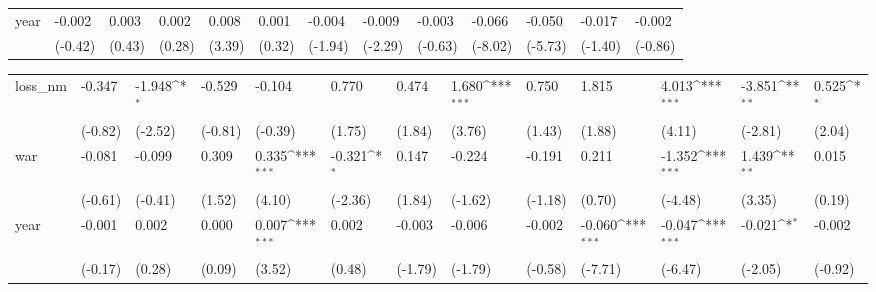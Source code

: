 \begin{tabular}{p{1.5cm} p{1.7cm} p{1.7cm} p{1.7cm} p{1.7cm} p{1.7cm} p{1.7cm} p{1.7cm} p{1.7cm} p{1.7cm} p{1.7cm} p{1.7cm} p{1.7cm}}
year            &   -0.002         &    0.003         &    0.002         &    0.008\sym{**} &    0.001         &   -0.004         &   -0.009\sym{*}  &   -0.003         &   -0.066\sym{***}&   -0.050\sym{***}&   -0.017         &   -0.002         \\
                &  (-0.42)         &   (0.43)         &   (0.28)         &   (3.39)         &   (0.32)         &  (-1.94)         &  (-2.29)         &  (-0.63)         &  (-8.02)         &  (-5.73)         &  (-1.40)         &  (-0.86)         \\
\end{tabular}
\def\sym#1{\ifmmode^{#1}\else\(^{#1}\)\fi}
\begin{tabular}{p{1.5cm} p{1.7cm} p{1.7cm} p{1.7cm} p{1.7cm} p{1.7cm} p{1.7cm} p{1.7cm} p{1.7cm} p{1.7cm} p{1.7cm} p{1.7cm} p{1.7cm}}
\hline
loss\_nm         &   -0.347         &   -1.948\sym{*}  &   -0.529         &   -0.104         &    0.770         &    0.474         &    1.680\sym{***}&    0.750         &    1.815         &    4.013\sym{***}&   -3.851\sym{**} &    0.525\sym{*}  \\
                &  (-0.82)         &  (-2.52)         &  (-0.81)         &  (-0.39)         &   (1.75)         &   (1.84)         &   (3.76)         &   (1.43)         &   (1.88)         &   (4.11)         &  (-2.81)         &   (2.04)         \\
war             &   -0.081         &   -0.099         &    0.309         &    0.335\sym{***}&   -0.321\sym{*}  &    0.147         &   -0.224         &   -0.191         &    0.211         &   -1.352\sym{***}&    1.439\sym{**} &    0.015         \\
                &  (-0.61)         &  (-0.41)         &   (1.52)         &   (4.10)         &  (-2.36)         &   (1.84)         &  (-1.62)         &  (-1.18)         &   (0.70)         &  (-4.48)         &   (3.35)         &   (0.19)         \\
year            &   -0.001         &    0.002         &    0.000         &    0.007\sym{***}&    0.002         &   -0.003         &   -0.006         &   -0.002         &   -0.060\sym{***}&   -0.047\sym{***}&   -0.021\sym{*}  &   -0.002         \\
                &  (-0.17)         &   (0.28)         &   (0.09)         &   (3.52)         &   (0.48)         &  (-1.79)         &  (-1.79)         &  (-0.58)         &  (-7.71)         &  (-6.47)         &  (-2.05)         &  (-0.92)         \\
\end{tabular}

